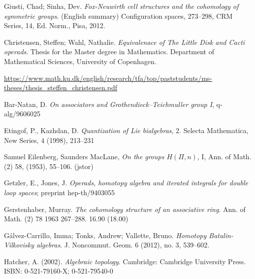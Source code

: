 \documentclass[TFM.tex]{subfiles}
\begin{document}
%


\begin{thebibliography}{}



 Giusti, Chad; Sinha, Dev.
\emph{Fox-Neuwirth cell structures and the cohomology of symmetric groups}. (English summary) Configuration spaces, 273–298, 
CRM Series, 14, Ed. Norm., Pisa, 2012.


 Christensen, Steffen; Wahl, Nathalie. \emph{Equivalenace of The Little Disk and
Cacti operads}. Thesis for the Master degree in Mathematics. Department of Mathematical Sciences, University of Copenhagen. %

 \url{https://www.math.ku.dk/english/research/tfa/top/paststudents/ms-theses/thesis_steffen_christensen.pdf}


 Bar-Natan, D. \emph{On associators and Grothendieck–Teichmuller group I}, q-alg/9606025


  Etingof, P., Kazhdan, D. \emph{Quantization of Lie bialgebras}, 2. Selecta Mathematica, New
Series, 4 (1998), 213–231


 Samuel Eilenberg, Saunders MacLane, \emph{On the groups $H(Π,n)$}, I, Ann. of Math. (2) 58, (1953), 55–106. (jstor) %


 Getzler, E., Jones, J. \emph{Operads, homotopy algebra and iterated integrals for double loop
spaces}; preprint hep-th/9403055


 Gerstenhaber, Murray. \emph{The cohomology structure of an associative ring}. 
Ann. of Math. (2) 78 1963 267–288. 
16.90 (18.00)  %


  Gálvez-Carrillo, Imma; Tonks, Andrew; Vallette, Bruno. \emph{Homotopy Batalin-Vilkovisky algebras}. J. Noncommut. Geom. 6 (2012), no. 3, 539–602.


 Hatcher, A. (2002). \emph{Algebraic topology}. Cambridge: Cambridge University Press. ISBN: 0-521-79160-X; 0-521-79540-0 



\end{thebibliography}
\end{document}
